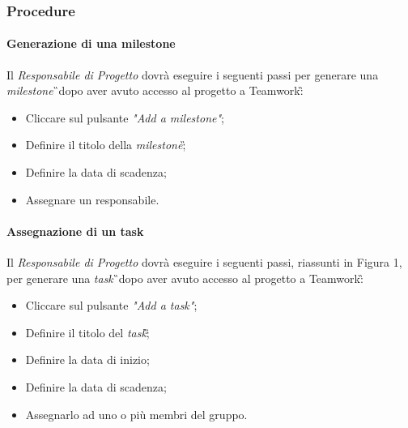 \subsubsection{Procedure}
\paragraph{Generazione di una milestone}
Il \textit{Responsabile di Progetto} dovrà eseguire i seguenti passi per generare una \textit{milestone}\G\ dopo aver avuto accesso al progetto a Teamwork\G:
\begin{itemize}
\item Cliccare sul pulsante \textit{"Add a milestone"};
\item Definire il titolo della \textit{milestone}\G;
\item Definire la data di scadenza;
\item Assegnare un responsabile.
\end{itemize}

\paragraph{Assegnazione di un task}
Il \textit{Responsabile di Progetto} dovrà eseguire i seguenti passi, riassunti in Figura 1, per generare una \textit{task}\G\ dopo aver avuto accesso al progetto a Teamwork\G:
\begin{itemize}
\item Cliccare sul pulsante \textit{"Add a task"};
\item Definire il titolo del \textit{task}\G;
\item Definire la data di inizio;
\item Definire la data di scadenza;
\item Assegnarlo ad uno o più membri del gruppo.
\end{itemize}

